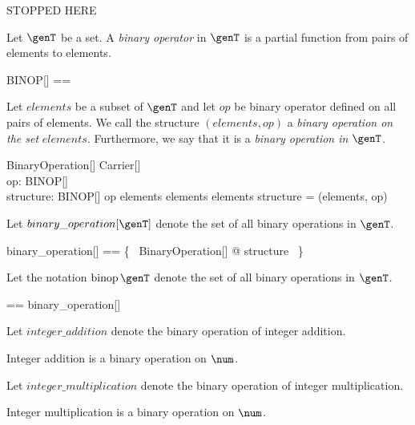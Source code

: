\documentclass{amsart}
\begin{document}
STOPPED HERE

Let $\genT$ be a set.
A \textit{binary operator} in $\genT$ is a partial function from pairs of elements to elements.
\begin{zed}
	BINOP[\genT] == \genT \cross \genT \pfun \genT
\end{zed}

Let $elements$ be a subset of $\genT$ and
let $op$ be binary operator defined on all pairs of elements.
We call the structure $(elements, op)$ a \textit{binary operation on the set} $elements$.
Furthermore, we say that it is a \textit{binary operation in} $\genT$.
\begin{schema}{BinaryOperation}[\genT]
	Carrier[\genT] \\
	op: BINOP[\genT] \\
	structure: \power \genT \cross BINOP[\genT]
\where
	op \in elements \cross elements \fun elements
\also
	structure = (elements, op)
\end{schema}

Let $binary\_operation[\genT]$ denote the set of all binary operations in $\genT$.
\begin{zed}
	binary\_operation[\genT] == \{~ BinaryOperation[\genT] @ structure ~\}
\end{zed}

Let the notation $\binop \genT$ denote the set of all binary operations in $\genT$.
\begin{zed}
	\binop \genT == binary\_operation[\genT]
\end{zed}

Let $integer\_addition$ denote the binary operation of integer addition.

\begin{example}
Integer addition is a binary operation on $\num$.
\end{example}

Let $integer\_multiplication$ denote the binary operation of integer multiplication.

\begin{example}
Integer multiplication is a binary operation on $\num$.
\end{example}
\end{document}
